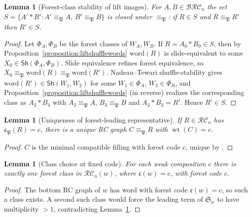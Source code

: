 \documentclass{amsart}
\newtheorem{lemma}[theorem]{Lemma}
\theoremstyle{definition}
\theoremstyle{remark}
\newcommand{\BRC}{\mathcal{BRC}}
\newcommand{\RC}{\mathcal{RC}}
\newcommand{\forest}{\mathfrak{P}}
\newcommand{\code}{\mathfrak{c}}
\newcommand{\wtt}{\operatorname{wt}}
\newcommand{\sch}{\mathfrak{S}}
\begin{document}
\begin{lemma}[Forest-class stability of lift images]\label{lemma:foreststable}
For $A,B\in\BRC_n$ the set $S=\{A'*B':A'\equiv_{\forest}A,\ B'\equiv_{\forest}B\}$ is closed under $\equiv_{\forest}$: if $R\in S$ and $R\equiv_{\forest}R'$ then $R'\in S$.
\end{lemma}
\begin{proof}
Let $\Phi_A,\Phi_B$ be the forest classes of $W_A,W_B$. If $R=A_0*B_0\in S$, then by Proposition~\ref{proposition:liftshufflewords} $\overline{\mathrm{word}(R)}$ is slide-equivalent to some $X_0\in\mathsf{Sh}(\Phi_A,\Phi_B)$. Slide equivalence refines forest equivalence, so $X_0\equiv_{\forest}\overline{\mathrm{word}(R)}\equiv_{\forest}\overline{\mathrm{word}(R')}$. Nadeau--Tewari shuffle-stability \cite[Theorem~6.3]{nadeau2024forest} gives $\overline{\mathrm{word}(R')}\in\mathsf{Sh}(W_1,W_2)$ for some $W_1\in\Phi_A$, $W_2\in\Phi_B$, and Proposition~\ref{proposition:liftshufflewords} (in reverse) realizes the corresponding class as $A_3*B_3$ with $A_3\equiv_{\forest}A$, $B_3\equiv_{\forest}B$ and $A_3*B_3=R'$. Hence $R'\in S$.
\end{proof}

\begin{lemma}[Uniqueness of forest-leading representative]\label{lemma:forestlead}
If $R\in\RC_n$ has $\code_{\forest}(R)=c$, there is a unique RC graph $C\equiv_{\forest}R$ with $\wtt(C)=c$.
\end{lemma}
\begin{proof}
$C$ is the minimal compatible filling with forest code $c$, unique by \cite[Lemma~3.12]{nadeau2024forest}.
\end{proof}

\begin{lemma}[Class choice at fixed code]\label{lemma:forestchoice}
For each weak composition $c$ there is exactly one forest class in $\RC_n(w)$, where $\code(w)=c$, with forest code $c$.
\end{lemma}
\begin{proof}
The bottom RC graph of $w$ has word with forest code $\code(w)=c$, so such a class exists. A second such class would force the leading term of $\sch_w$ to have multiplicity $>1$, contradicting Lemma~\ref{lemma:forestlead}.
\end{proof}
\end{document}
